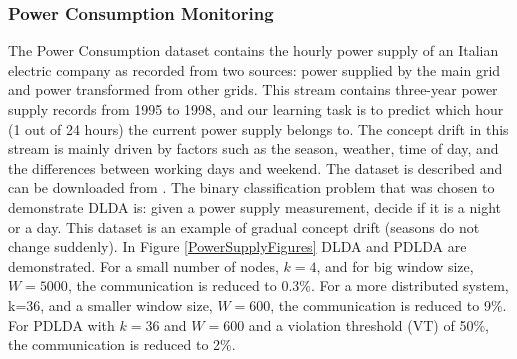 \documentclass[11pt,twocolumn,varwidth=true,a4paper,fleqn]{article}
\begin{document}
\subsubsection{Power Consumption Monitoring}
The Power Consumption dataset contains the hourly power supply of an 
Italian electric company as recorded from two sources: power supplied 
by the main grid and power transformed from other grids. 
This stream contains three-year power supply records 
from 1995 to 1998, and our learning task is to predict which hour (1 out of 24 hours) the 
current power supply belongs to. The concept drift in this stream 
is mainly driven by factors such as the season, weather, time of day, 
and the differences between working days and weekend.  
The dataset is described and can be downloaded from \cite{powerSupply}.
The binary classification problem that was chosen to demonstrate DLDA is:
given a power supply measurement, decide if it is a night or a day. 
This dataset is an example of gradual concept drift (seasons do not
change suddenly).
In Figure \ref{PowerSupplyFigures} DLDA
and PDLDA are demonstrated. For a small number of nodes, $k=4$, and for big
window size, $W=5000$, the communication is reduced to 0.3\%. 
For a more distributed system, k=36, and a smaller window
size, $W=600$, the communication is reduced to 9\%. For PDLDA with
$k=36$ and $W=600$ and a violation threshold (VT) of 50\%, the communication 
is reduced to 2\%.
\end{document}
